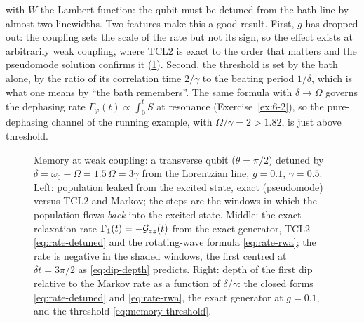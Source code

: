 with $W$ the Lambert function: the qubit must be detuned from the bath line by almost two linewidths.
Two features make this a good result.
First, $g$ has dropped out: the coupling sets the scale of the rate but not its sign, so the effect exists at arbitrarily weak coupling, where TCL2 is exact to the order that matters and the pseudomode solution confirms it (\cref{fig:memory}).
Second, the threshold is set by the bath alone, by the ratio of its correlation time $2/\gamma$ to the beating period $1/\delta$, which is what one means by ``the bath remembers''.
The same formula with $\delta\to\Omega$ governs the dephasing rate $\Gamma_\varphi(t)\propto\int_0^tS$ at resonance (Exercise~\ref{ex:6-2}), so the pure-dephasing channel of the running example, with $\Omega/\gamma=2>1.82$, is just above threshold.

\begin{figure}[t]
\centering
\hfill\hfill
\caption{Memory at weak coupling: a transverse qubit ($\theta=\pi/2$) detuned by $\delta=\omega_0-\Omega=1.5\,\Omega=3\gamma$ from the Lorentzian line, $g=0.1$, $\gamma=0.5$.
Left: population leaked from the excited state, exact (pseudomode) versus TCL2 and Markov; the steps are the windows in which the population flows \emph{back} into the excited state.
Middle: the exact relaxation rate $\Gamma_1(t)=-\mathcal{G}_{zz}(t)$ from the exact generator, TCL2 \eqref{eq:rate-detuned} and the rotating-wave formula \eqref{eq:rate-rwa}; the rate is negative in the shaded windows, the first centred at $\delta t=3\pi/2$ as \cref{eq:dip-depth} predicts.
Right: depth of the first dip relative to the Markov rate as a function of $\delta/\gamma$: the closed forms \eqref{eq:rate-detuned} and \eqref{eq:rate-rwa}, the exact generator at $g=0.1$, and the threshold \eqref{eq:memory-threshold}.}
\label{fig:memory}
\end{figure}

